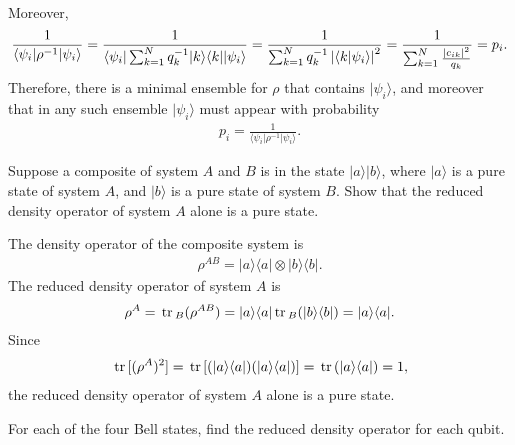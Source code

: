 \documentclass[en]{sol-man}
\begin{document}
\begin{pf}
\begin{align}
    \end{align}
    Moreover,
    \begin{align}
        \frac{1}{\langle\psi_i\rvert\rho^{-1}\lvert\psi_i\rangle}=\frac{1}{\langle\psi_i\rvert\sum_{k=1}^Nq_k^{-1}\lvert k\rangle\langle k\rvert\lvert\psi_i\rangle}=\frac{1}{\sum_{k=1}^Nq_k^{-1}\left\lvert\langle k\vert\psi_i\rangle\right\rvert^2}=\frac{1}{\sum_{k=1}^N\frac{\left\lvert c_{ik}\right\rvert^2}{q_k}}=p_i.
    \end{align}
    Therefore, there is a minimal ensemble for $\rho$ that contains $\lvert\psi_i\rangle$, and moreover that in any such ensemble $\lvert\psi_i\rangle$ must appear with probability
    \begin{align}
        p_i=\frac{1}{\langle\psi_i\rvert\rho^{-1}\lvert\psi_i\rangle}.
    \end{align}
\end{pf}

\begin{exe}
    Suppose a composite of system $A$ and $B$ is in the state $\lvert a\rangle\lvert b\rangle$, where $\lvert a\rangle$ is a pure state of system $A$, and $\lvert b\rangle$ is a pure state of system $B$. Show that the reduced density operator of system $A$ alone is a pure state.
\end{exe}
\begin{pf}
    The density operator of the composite system is
    \begin{align}
        \rho^{AB}=\lvert a\rangle\langle a\rvert\otimes\lvert b\rangle\langle b\rvert.
    \end{align}
    The reduced density operator of system $A$ is
    \begin{align}
        \rho^A=\,\mathrm{tr}\,_B(\rho^{AB})=\lvert a\rangle\langle a\rvert\,\mathrm{tr}\,_B(\lvert b\rangle\langle b\rvert)=\lvert a\rangle\langle a\rvert.
    \end{align}
    Since
    \begin{align}
        \,\mathrm{tr}\,[(\rho^A)^2]=\,\mathrm{tr}\,[(\lvert a\rangle\langle a\rvert)(\lvert a\rangle\langle a\rvert)]=\,\mathrm{tr}\,(\lvert a\rangle\langle a\rvert)=1,
    \end{align}
    the reduced density operator of system $A$ alone is a pure state.
\end{pf}

\begin{exe}
    For each of the four Bell states, find the reduced density operator for each qubit.
\end{exe}
\begin{sol}
    
\end{sol}

\ifx\allfiles\undefined
\end{document}
